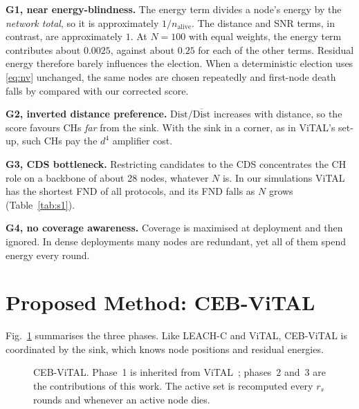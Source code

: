 \documentclass[journal]{IEEEtran}
\begin{document}
\textbf{G1, near energy-blindness.} The energy term divides a node's energy by the \emph{network total}, so it is approximately $1/n_{\mathrm{alive}}$. The distance and SNR terms, in contrast, are approximately $1$. At $N=100$ with equal weights, the energy term contributes about $0.0025$, against about $0.25$ for each of the other terms. Residual energy therefore barely influences the election. When a deterministic election uses \eqref{eq:nv} unchanged, the same nodes are chosen repeatedly and first-node death falls by \AblMone{} compared with our corrected score.

\textbf{G2, inverted distance preference.} $\mathrm{Dist}/\overline{\mathrm{Dist}}$ increases with distance, so the score favours CHs \emph{far} from the sink. With the sink in a corner, as in ViTAL's set-up, such CHs pay the $d^4$ amplifier cost.

\textbf{G3, CDS bottleneck.} Restricting candidates to the CDS concentrates the CH role on a backbone of about 28 nodes, whatever $N$ is. In our simulations ViTAL has the shortest FND of all protocols, and its FND falls as $N$ grows (Table~\ref{tab:s1}).

\textbf{G4, no coverage awareness.} Coverage is maximised at deployment and then ignored. In dense deployments many nodes are redundant, yet all of them spend energy every round.

\section{Proposed Method: CEB-ViTAL}\label{sec:method}
Fig.~\ref{fig:arch} summarises the three phases. Like LEACH-C and ViTAL, CEB-ViTAL is coordinated by the sink, which knows node positions and residual energies.

\begin{figure}[t]
\centering
{}
\caption{CEB-ViTAL. Phase~1 is inherited from ViTAL~\cite{ali2025vital}; phases~2 and~3 are the contributions of this work. The active set is recomputed every $r_s$ rounds and whenever an active node dies.}\label{fig:arch}
\end{figure}
\end{document}
